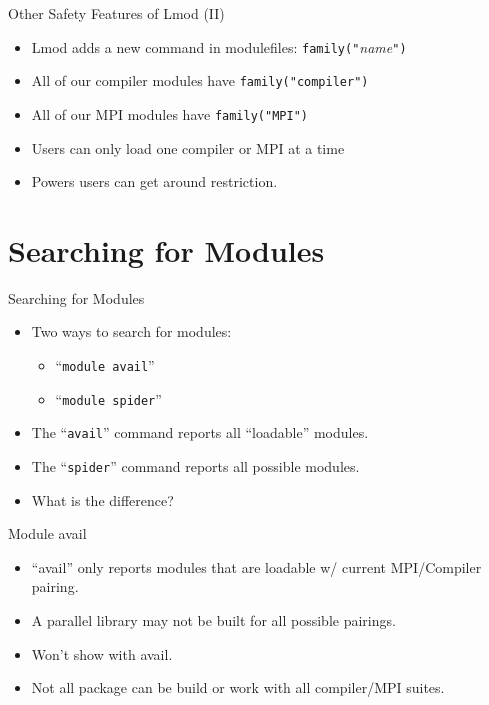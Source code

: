 \documentclass{beamer}
\begin{document}
\begin{frame}{Other Safety Features of Lmod (II)}
  \begin{itemize}
    \item Lmod adds a new command in modulefiles: \texttt{family("}\emph{name}\texttt{")}
    \item All of our compiler modules have \texttt{family("compiler")}
    \item All of our MPI modules have \texttt{family("MPI")}
    \item Users can only load one compiler or MPI at a time
    \item Powers users can get around restriction.
  \end{itemize}
\end{frame}

\section{Searching for Modules}
\label{sec:search}


\begin{frame}{Searching for Modules}
  \begin{itemize}
    \item Two ways to search for modules:
      \begin{itemize}
        \item ``\texttt{module avail}''
        \item ``\texttt{module spider}''
      \end{itemize}
    \item The ``\texttt{avail}''  command reports all ``loadable'' modules.
    \item The ``\texttt{spider}'' command reports all possible modules.
    \item What is the difference?
  \end{itemize}
\end{frame}

\begin{frame}{Module avail}
  \begin{itemize}
    \item ``avail'' only reports modules that are loadable w/ current
      MPI/Compiler pairing.
    \item A parallel library may not be built for all possible pairings.
    \item Won't show with avail.
    \item Not all package can be build or work with all compiler/MPI suites.
  \end{itemize}
\end{frame}
\end{document}
